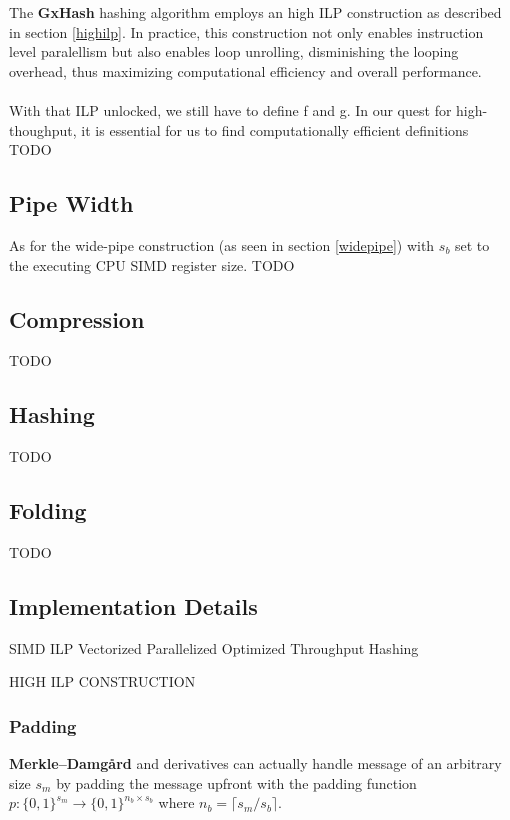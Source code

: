 \documentclass[10pt]{article}
\begin{document}
The \textbf{GxHash} hashing algorithm employs an high ILP construction as described in section \ref{highilp}. In practice,
this construction not only enables instruction level paralellism but also enables loop unrolling, disminishing the looping overhead,
thus maximizing computational efficiency and overall performance.\\\\
With that ILP unlocked, we still have to define f and g. In our quest for high-thoughput, it is essential for us to find computationally
efficient definitions TODO

\subsection{Pipe Width}
As for the wide-pipe construction (as seen in section \ref{widepipe}) with \( s_b \) set to the executing CPU SIMD register size.
TODO

\subsection{Compression}

TODO

\subsection{Hashing}

TODO

\subsection{Folding}

TODO

\subsection{Implementation Details}

SIMD
ILP
Vectorized
Parallelized
Optimized
Throughput
Hashing

HIGH ILP CONSTRUCTION

\subsubsection{Padding}

\textbf{Merkle–Damgård} and derivatives can actually handle message of an arbitrary size \( s_m \) by padding the message upfront with the padding
function \( p: \{0,1\}^{s_m} \to \{0,1\}^{n_b \times s_b} \) where \( n_b = \lceil s_m/s_b \rceil \).
\end{document}

